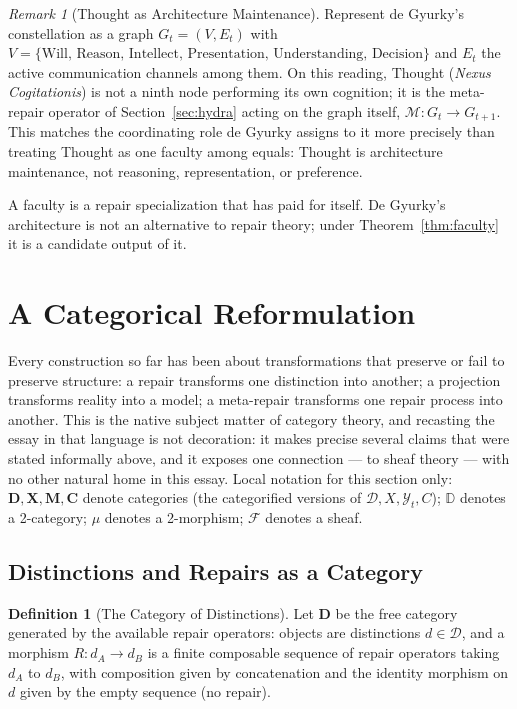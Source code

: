\documentclass[11pt]{article}
\theoremstyle{plain}
\theoremstyle{definition}
\newtheorem{definition}[theorem]{Definition}
\theoremstyle{remark}
\newtheorem{remark}[theorem]{Remark}
\begin{document}
\begin{remark}[Thought as Architecture Maintenance]
Represent de Gyurky's constellation as a graph $G_t = (V,E_t)$ with $V = \{\text{Will, Reason, Intellect, Presentation, Understanding, Decision}\}$ and $E_t$ the active communication channels among them. On this reading, Thought (\emph{Nexus Cogitationis}) is not a ninth node performing its own cognition; it is the meta-repair operator of Section~\ref{sec:hydra} acting on the graph itself, $\mathcal{M} : G_t \to G_{t+1}$. This matches the coordinating role de Gyurky assigns to it more precisely than treating Thought as one faculty among equals: Thought is architecture maintenance, not reasoning, representation, or preference.
\end{remark}

\begin{tcolorbox}[title=Faculty Crystallization Principle]
A faculty is a repair specialization that has paid for itself. De Gyurky's architecture is not an alternative to repair theory; under Theorem~\ref{thm:faculty} it is a candidate output of it.
\end{tcolorbox}

\section{A Categorical Reformulation}
\label{sec:cat}

Every construction so far has been about transformations that preserve or fail to preserve structure: a repair transforms one distinction into another; a projection transforms reality into a model; a meta-repair transforms one repair process into another. This is the native subject matter of category theory, and recasting the essay in that language is not decoration: it makes precise several claims that were stated informally above, and it exposes one connection --- to sheaf theory --- with no other natural home in this essay. Local notation for this section only: $\mathbf{D}, \mathbf{X}, \mathbf{M}, \mathbf{C}$ denote categories (the categorified versions of $\mathcal{D}, X, \mathcal{Y}_t, C$); $\mathbb{D}$ denotes a 2-category; $\mu$ denotes a 2-morphism; $\mathscr{F}$ denotes a sheaf.

\subsection{Distinctions and Repairs as a Category}

\begin{definition}[The Category of Distinctions]
Let $\mathbf{D}$ be the free category generated by the available repair operators: objects are distinctions $d \in \mathcal{D}$, and a morphism $R : d_A \to d_B$ is a finite composable sequence of repair operators taking $d_A$ to $d_B$, with composition given by concatenation and the identity morphism on $d$ given by the empty sequence (no repair).
\end{definition}
\end{document}
